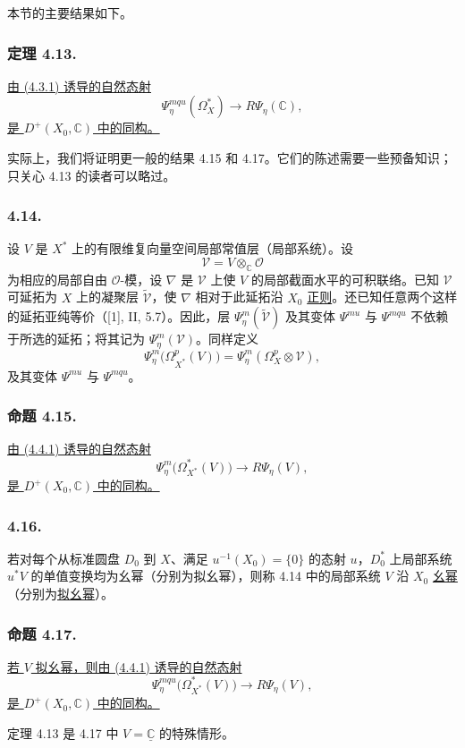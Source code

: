 本节的主要结果如下。

\subsubsection*{定理 4.13.}
\underline{由 (4.3.1) 诱导的自然态射}
\begin{equation}\tag{4.13.1}
\Psi_\eta^{mqu}(\Omega_X^*)
\longrightarrow R\Psi_\eta(\mathbb C),
\end{equation}
\underline{是 $D^+(X_0,\mathbb C)$ 中的同构。}

实际上，我们将证明更一般的结果 4.15 和 4.17。它们的陈述需要一些预备知识；只关心 4.13 的读者可以略过。

\subsubsection*{4.14.}
设 $V$ 是 $X^*$ 上的有限维复向量空间局部常值层（局部系统）。设
\[
\mathcal V=V\otimes_{\mathbb C}\mathcal O
\]
为相应的局部自由 $\mathcal O$-模，设 $\nabla$ 是 $\mathcal V$ 上使 $V$ 的局部截面水平的可积联络。已知 $\mathcal V$ 可延拓为 $X$ 上的凝聚层 $\widetilde{\mathcal V}$，使 $\nabla$ 相对于此延拓沿 $X_0$ \underline{正则}。还已知任意两个这样的延拓亚纯等价（[1], II, 5.7）。因此，层 $\Psi_\eta^m(\widetilde{\mathcal V})$ 及其变体 $\Psi^{mu}$ 与 $\Psi^{mqu}$ 不依赖于所选的延拓；将其记为 $\Psi_\eta^m(\mathcal V)$。同样定义
\[
\Psi_\eta^m\bigl(\Omega_{X^*}^p(V)\bigr)
=\Psi_\eta^m(\Omega_X^p\otimes\mathcal V),
\]
及其变体 $\Psi^{mu}$ 与 $\Psi^{mqu}$。

\subsubsection*{命题 4.15.}
\underline{由 (4.4.1) 诱导的自然态射}
\begin{equation}\tag{4.15.1}
\Psi_\eta^m\bigl(\Omega_{X^*}^*(V)\bigr)
\longrightarrow R\Psi_\eta(V),
\end{equation}
\underline{是 $D^+(X_0,\mathbb C)$ 中的同构。}

\subsubsection*{4.16.}
若对每个从标准圆盘 $D_0$ 到 $X$、满足 $u^{-1}(X_0)=\{0\}$ 的态射 $u$，$D_0^*$ 上局部系统 $u^*V$ 的单值变换均为幺幂（分别为拟幺幂），则称 4.14 中的局部系统 $V$ 沿 $X_0$ \underline{幺幂}（分别为\underline{拟幺幂}）。

\subsubsection*{命题 4.17.}
\underline{若 $V$ 拟幺幂，则由 (4.4.1) 诱导的自然态射}
\begin{equation}\tag{4.17.1}
\Psi_\eta^{mqu}\bigl(\Omega_{X^*}^*(V)\bigr)
\longrightarrow R\Psi_\eta(V),
\end{equation}
\underline{是 $D^+(X_0,\mathbb C)$ 中的同构。}

定理 4.13 是 4.17 中 $V=\underline{\mathbb C}$ 的特殊情形。